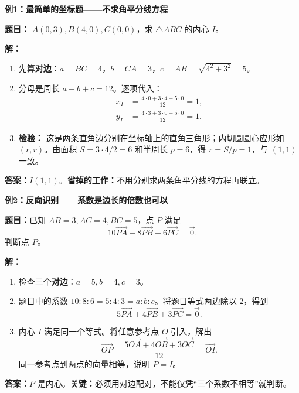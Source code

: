\begin{examplebox}
\par\noindent\begin{minipage}{\linewidth}
\textbf{例1：最简单的坐标题——不求角平分线方程}

\textbf{题目：} $A(0,3),B(4,0),C(0,0)$，求 $\triangle ABC$ 的内心 $I$。

\end{minipage}\par
\textbf{解：}
\begin{enumerate}
\item 先算\textbf{对边}：$a=BC=4$，$b=CA=3$，$c=AB=\sqrt{4^2+3^2}=5$。
\item 分母是周长 $a+b+c=12$。逐项代入：
\[
\begin{aligned}
x_I&=\frac{4\cdot0+3\cdot4+5\cdot0}{12}=1,\\
y_I&=\frac{4\cdot3+3\cdot0+5\cdot0}{12}=1.
\end{aligned}
\]
\item \textbf{检验：} 这是两条直角边分别在坐标轴上的直角三角形；内切圆圆心应形如 $(r,r)$。由面积 $S=3\cdot4/2=6$ 和半周长 $p=6$，得 $r=S/p=1$，与 $(1,1)$ 一致。
\end{enumerate}
\textbf{答案：}$\boxed{I(1,1)}$。\textbf{省掉的工作：}不用分别求两条角平分线的方程再联立。
\end{examplebox}

\begin{examplebox}
\par\noindent\begin{minipage}{\linewidth}
\textbf{例2：反向识别——系数是边长的倍数也可以}

\textbf{题目：}已知 $AB=3,AC=4,BC=5$，点 $P$ 满足
\[
10\vec{PA}+8\vec{PB}+6\vec{PC}=\vec0.
\]
判断点 $P$。

\end{minipage}\par
\textbf{解：}
\begin{enumerate}
\item 检查三个\textbf{对边}：$a=5,b=4,c=3$。
\item 题目中的系数 $10:8:6=5:4:3=a:b:c$。将题目等式两边除以 $2$，得到
\[5\vec{PA}+4\vec{PB}+3\vec{PC}=\vec0.\]
\item 内心 $I$ 满足同一个等式。将任意参考点 $O$ 引入，解出
\[
\vec{OP}=\frac{5\vec{OA}+4\vec{OB}+3\vec{OC}}{12}
=\vec{OI}.
\]
同一参考点到两点的向量相等，说明 $P=I$。
\end{enumerate}
\textbf{答案：}$\boxed{P\text{ 是内心}}$。\textbf{关键：}必须用对边配对，不能仅凭“三个系数不相等”就判断。
\end{examplebox}

